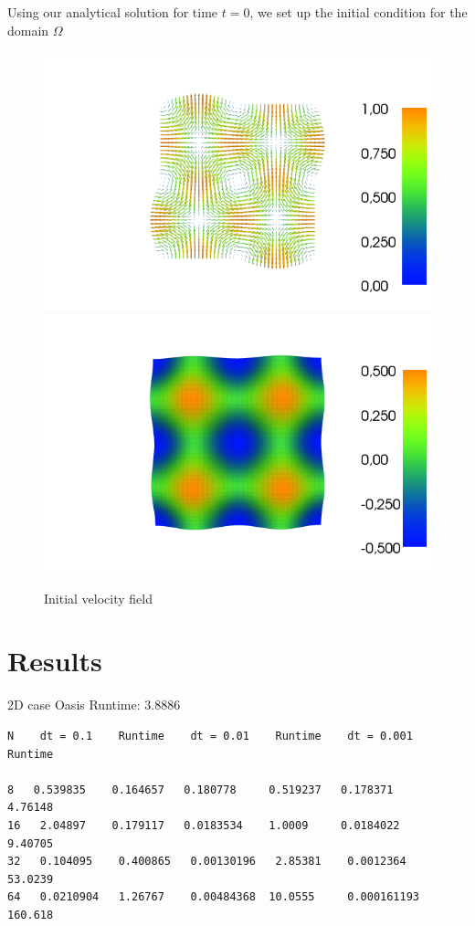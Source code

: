 \documentclass[a4paper,norsk]{article}
\begin{document}
Using our analytical solution for time $t = 0$, we set up the initial condition
for the domain $\Omega$

\begin{figure}[h!]
	\centering
	\caption*{Initial velocity field}
	\includegraphics[scale=0.32]{2D/initial.png}
    \includegraphics[scale=0.32]{2D/initpress.png}
\end{figure}


\section*{Results}
2D case Oasis Runtime: 3.8886 \\

\begin{lstlisting}
N    dt = 0.1    Runtime    dt = 0.01    Runtime    dt = 0.001    Runtime

8   0.539835    0.164657   0.180778     0.519237   0.178371       4.76148
16   2.04897    0.179117   0.0183534    1.0009     0.0184022      9.40705
32   0.104095    0.400865   0.00130196   2.85381    0.0012364     53.0239
64   0.0210904   1.26767    0.00484368  10.0555     0.000161193  160.618
\end{lstlisting}
\end{document}
